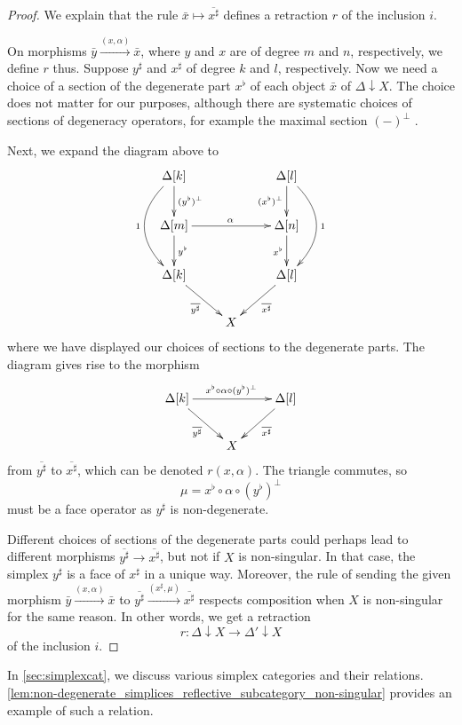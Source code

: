 \begin{proof}
We explain that the rule $\bar{x} \mapsto \overline{x^\sharp }$ defines a retraction $r$ of the inclusion $i$.

On morphisms $\bar{y} \xrightarrow{(x,\alpha )} \bar{x}$, where $y$ and $x$ are of degree $m$ and $n$, respectively, we define $r$ thus. Suppose $y^\sharp$ and $x^\sharp$ of degree $k$ and $l$, respectively. Now we need a choice of a section of the degenerate part $x^\flat$ of each object $\bar{x}$ of $\Delta \downarrow X$. The choice does not matter for our purposes, although there are systematic choices of sections of degeneracy operators, for example the maximal section $(-)^\perp$ \cite[p.~136]{FP90}.

Next, we expand the diagram above to
\begin{displaymath}
\xymatrix{
\Delta [k] \ar@/_2pc/[dd]_1 \ar[d]^{(y^\flat )^\perp } && \Delta [l] \ar[d]_{(x^\flat )^\perp } \ar@/^2pc/[dd]^1 \\
\Delta [m] \ar[d]^{y^\flat } \ar[rr]^\alpha && \Delta [n] \ar[d]_{x^\flat } \\
\Delta [k] \ar[dr]_{\overline{y^\sharp } } && \Delta [l] \ar[ld]^{\overline{x^\sharp } } \\
& X
}
\end{displaymath}
where we have displayed our choices of sections to the degenerate parts. The diagram gives rise to the morphism
\begin{displaymath}
\xymatrix{
\Delta [k] \ar[dr]_{\overline{y^\sharp } } \ar[rr]^{x^\flat \circ \alpha \circ (y^\flat )^\perp } && \Delta [l] \ar[ld]^{\overline{x^\sharp } } \\
& X
}
\end{displaymath}
from $\overline{y^\sharp }$ to $\overline{x^\sharp }$, which can be denoted $r(x,\alpha )$. The triangle commutes, so
\[\mu =x^\flat \circ \alpha \circ (y^\flat )^\perp\]
must be a face operator as $y^\sharp$ is non-degenerate.

Different choices of sections of the degenerate parts could perhaps lead to different morphisms $\overline{y^\sharp } \to \overline{x^\sharp }$, but not if $X$ is non-singular. In that case, the simplex $y^\sharp$ is a face of $x^\sharp$ in a unique way. Moreover, the rule of sending the given morphism $\bar{y} \xrightarrow{(x,\alpha )} \bar{x} $ to $\overline{y^\sharp } \xrightarrow{(x^\sharp ,\mu )} \overline{x^\sharp }$ respects composition when $X$ is non-singular for the same reason. In other words, we get a retraction
\[r:\Delta \downarrow X\to \Delta '\downarrow X\]
of the inclusion $i$.
\end{proof}
\noindent In \cref{sec:simplexcat}, we discuss various simplex categories and their relations.\\ \cref{lem:non-degenerate_simplices_reflective_subcategory_non-singular} provides an example of such a relation.

